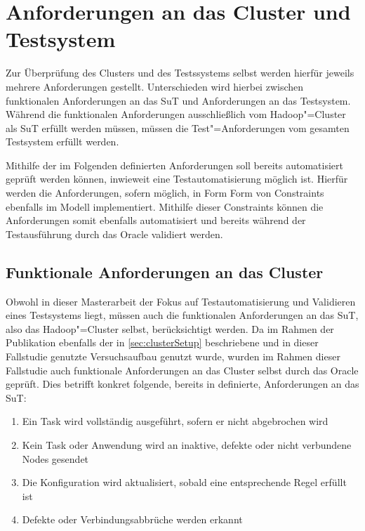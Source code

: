 \section{Anforderungen an das Cluster und Testsystem}
\label{sec:requirements}

Zur Überprüfung des Clusters und des Testssystems selbst werden hierfür jeweils mehrere Anforderungen gestellt.
Unterschieden wird hierbei zwischen funktionalen Anforderungen an das \ac{SuT} und Anforderungen an das Testsystem.
Während die funktionalen Anforderungen ausschließlich vom Hadoop"=Cluster als \ac{SuT} erfüllt werden müssen, müssen die Test"=Anforderungen vom gesamten Testsystem erfüllt werden.

Mithilfe der im Folgenden definierten Anforderungen soll bereits automatisiert geprüft werden können, inwieweit eine Testautomatisierung möglich ist.
Hierfür werden die Anforderungen, sofern möglich, in Form  Form von Constraints ebenfalls im Modell implementiert.
Mithilfe dieser Constraints können die Anforderungen somit ebenfalls automatisiert und bereits während der Testausführung durch das Oracle validiert werden.

\subsection{Funktionale Anforderungen an das Cluster}
\label{subsec:functionalRequirements}

Obwohl in dieser Masterarbeit der Fokus auf Testautomatisierung und Validieren eines Testsystems liegt, müssen auch die funktionalen Anforderungen an das \ac{SuT}, also das Hadoop"=Cluster selbst, berücksichtigt werden.
Da im Rahmen der Publikation \cite{Eberhardinger2018} ebenfalls der in \autoref{sec:clusterSetup} beschriebene und in dieser Fallstudie genutzte Versuchsaufbau genutzt wurde, wurden im Rahmen dieser Fallstudie auch funktionale Anforderungen an das Cluster selbst durch das Oracle geprüft.
Dies betrifft konkret folgende, bereits in \cite{Eberhardinger2018} definierte, Anforderungen an das \ac{SuT}:

\begin{enumerate}
    \item Ein Task wird vollständig ausgeführt, sofern er nicht abgebrochen wird
    \item Kein Task oder Anwendung wird an inaktive, defekte oder nicht verbundene Nodes gesendet
    \item Die Konfiguration wird aktualisiert, sobald eine entsprechende Regel erfüllt ist
    \item Defekte oder Verbindungsabbrüche werden erkannt
\end{enumerate}

